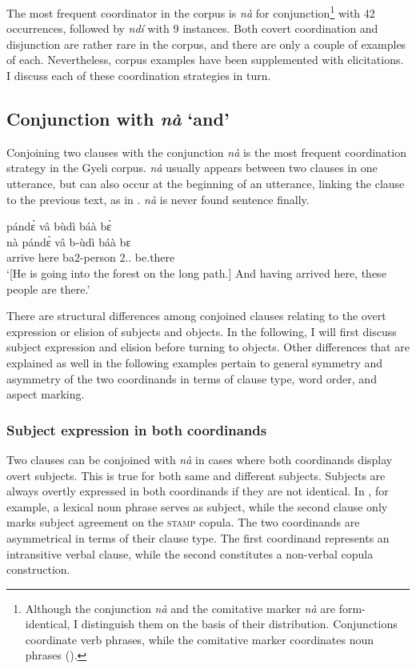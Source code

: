 The most frequent coordinator in the corpus is {\itshape nà} for conjunction\footnote{Although the conjunction {\itshape nà} and the comitative marker {\itshape nà} are form-identical, I distinguish them on the basis of their distribution. Conjunctions coordinate verb phrases, while the comitative marker coordinates noun phrases ().} with 42 occurrences, followed by {\itshape ndí} with 9 instances. Both covert coordination and disjunction are rather rare in the corpus, and there are only a couple of examples of each. Nevertheless, corpus examples have been supplemented with elicitations. I discuss each of these coordination strategies in turn.


\subsection{Conjunction with {\itshape nà} `and'}
\label{sec:Conjunction}

Conjoining two clauses with the conjunction {\itshape nà} is the most frequent coordination strategy in the Gyeli corpus. {\itshape nà} usually appears between two clauses in one utterance, but can also occur at the beginning of an utterance, linking the clause to the previous text, as in .
{\itshape nà} is never found sentence finally.


\ea\label{Coord}
   pándɛ̀ vâ bùdì báà bɛ̀ \\
          nà pándɛ̀ vâ b-ùdì báà bɛ \\
      {\CONJ} arrive here ba2-person 2.{\DEM}.{\PROX} be.there\\
    \trans `[He is going into the forest on the long path.] And having arrived here, these people are there.'
\z



There are structural differences among conjoined clauses relating to the overt expression or elision of subjects and objects. In the following, I will first discuss subject expression and elision before turning to objects. Other differences that are explained as well in the following examples pertain to general symmetry and asymmetry of the two coordinands in terms of clause type, word order, and aspect marking.

\subsubsection*{Subject expression in both coordinands}
Two clauses can be conjoined with {\itshape nà} in cases where both coordinands display overt subjects. This is true for both same and different subjects. 
Subjects are always overtly expressed in both coordinands if they are not identical. In , for example, a lexical noun phrase serves as subject, while the second clause only marks subject agreement on the \textsc{stamp} copula. The two coordinands are asymmetrical in terms of their clause type.  The first coordinand represents an intransitive verbal clause, while the second constitutes a non-verbal copula construction.


